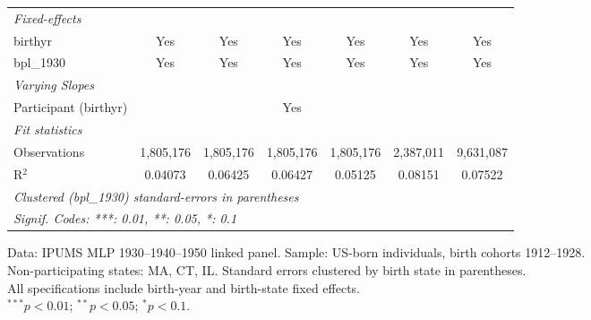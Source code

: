 \begin{table}[htbp]
\begin{adjustbox}{max width=\textwidth}
\begin{tabular}{lcccccc}
      \midrule
      \emph{Fixed-effects}\\
      birthyr                       & Yes          & Yes            & Yes            & Yes             & Yes             & Yes\\  
      bpl\_1930                     & Yes          & Yes            & Yes            & Yes             & Yes             & Yes\\  
      \midrule
      \emph{Varying Slopes}\\
      Participant (birthyr)         &              &                & Yes            &                 &                 & \\  
      \midrule
      \emph{Fit statistics}\\
      Observations                  & 1,805,176    & 1,805,176      & 1,805,176      & 1,805,176       & 2,387,011       & 9,631,087\\  
      R$^2$                         & 0.04073      & 0.06425        & 0.06427        & 0.05125         & 0.08151         & 0.07522\\  
      \midrule \midrule
      \multicolumn{7}{l}{\emph{Clustered (bpl\_1930) standard-errors in parentheses}}\\
      \multicolumn{7}{l}{\emph{Signif. Codes: ***: 0.01, **: 0.05, *: 0.1}}\\
   \end{tabular}
   \end{adjustbox}
   
   \par \raggedright 
   Data: IPUMS MLP 1930--1940--1950 linked panel. Sample: US-born individuals, birth cohorts 1912--1928.\\
   Non-participating states: MA, CT, IL. Standard errors clustered by birth state in parentheses.\\
   All specifications include birth-year and birth-state fixed effects.\\
   $^{***}p<0.01$; $^{**}p<0.05$; $^{*}p<0.1$.
\end{table}


